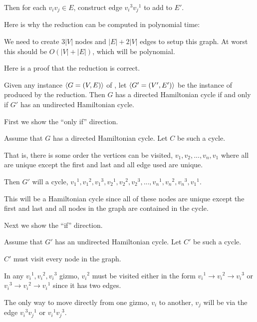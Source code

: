 \documentclass[11pt]{article}
\begin{document}
\begin{problems}
  Then for each $v_iv_j \in E$, construct edge ${v_i}^3{v_j}^1$ to add to $E'$.
  \lineacross 

  \medskip 
  Here is why the reduction can be computed in polynomial time:

  \lineacross 
  We need to create $3|V|$ nodes and $|E| + 2|V|$ edges to setup this graph. At worst this should be $O(|V| + |E|)$, which will be polynomial.
  \lineacross 

  \medskip 
  Here is a proof that the reduction is correct.
  \begin{lemma}
    Given any instance $\langle G=(V,E) \rangle$ of ,
    let $\langle G'=(V',E') \rangle$ be the instance of  produced by the reduction.
    Then $G$ has a directed Hamiltonian cycle 
    if and only if $G'$ has an undirected Hamiltonian cycle.
  \end{lemma}
  \begin{longFormProof}
    \step First we show the ``only if'' direction.
    \begin{block}[2oi]
      {Assume that $G$ has a directed Hamiltonian cycle.}
      \step Let $C$ be such a cycle.

      \step That is, there is some order the vertices can be visited, $v_1, v_2, ..., v_n, v_1$ where all are unique except the first and last and all edge used are unique.

      \step Then $G'$ will a cycle, ${v_1}^1, {v_1}^2, {v_1}^3, {v_2}^1, {v_2}^2, {v_2}^3, ..., {v_n}^1, {v_n}^2, {v_n}^3, {v_1}^1$.

      \step This will be a Hamiltonian cycle since all of these nodes are unique except the first and last and all 
            nodes in the graph are contained in the cycle.

    \end{block} 
    \step Next we show the ``if'' direction.
    \begin{block}[2i]
      {Assume that $G'$ has an undirected Hamiltonian cycle.}
      \step Let $C'$ be such a cycle.

      \step $C'$ must visit every node in the graph.

      \step In any ${v_i}^1, {v_i}^2, {v_i}^3$ gizmo, ${v_i}^2$ must be visited either in the form 
            ${v_i}^1\rightarrow{v_i}^2\rightarrow{v_i}^3$ or ${v_i}^3\rightarrow{v_i}^2\rightarrow{v_i}^1$ since it has two edges.

      \step The only way to move directly from one gizmo, $v_i$ to another, $v_j$ will be via the edge ${v_i}^3{v_j}^1$ or ${v_i}^1{v_j}^3$.


\end{block}
\end{longFormProof}
\end{problems}
\end{document}
